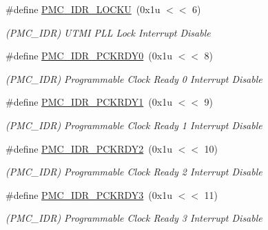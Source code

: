 \begin{DoxyCompactItemize}
\mbox{\label{group__SAME70__PMC_ga313fb194776f6a326f91150df714f990}} 
\#define \mbox{\hyperlink{group__SAME70__PMC_ga313fb194776f6a326f91150df714f990}{P\+M\+C\+\_\+\+I\+D\+R\+\_\+\+L\+O\+C\+KU}}~(0x1u $<$$<$ 6)
\begin{DoxyCompactList}\small\item\em (P\+M\+C\+\_\+\+I\+DR) U\+T\+MI P\+LL Lock Interrupt Disable \end{DoxyCompactList}\item 
\mbox{\label{group__SAME70__PMC_gac6c95ab23e8b9ad179d3db96fa6c5d7b}} 
\#define \mbox{\hyperlink{group__SAME70__PMC_gac6c95ab23e8b9ad179d3db96fa6c5d7b}{P\+M\+C\+\_\+\+I\+D\+R\+\_\+\+P\+C\+K\+R\+D\+Y0}}~(0x1u $<$$<$ 8)
\begin{DoxyCompactList}\small\item\em (P\+M\+C\+\_\+\+I\+DR) Programmable Clock Ready 0 Interrupt Disable \end{DoxyCompactList}\item 
\mbox{\label{group__SAME70__PMC_ga41d50baa84ca59665f79584f6c769f54}} 
\#define \mbox{\hyperlink{group__SAME70__PMC_ga41d50baa84ca59665f79584f6c769f54}{P\+M\+C\+\_\+\+I\+D\+R\+\_\+\+P\+C\+K\+R\+D\+Y1}}~(0x1u $<$$<$ 9)
\begin{DoxyCompactList}\small\item\em (P\+M\+C\+\_\+\+I\+DR) Programmable Clock Ready 1 Interrupt Disable \end{DoxyCompactList}\item 
\mbox{\label{group__SAME70__PMC_ga3b5f0b5c79321b5b99ab7f2fdeda0ed1}} 
\#define \mbox{\hyperlink{group__SAME70__PMC_ga3b5f0b5c79321b5b99ab7f2fdeda0ed1}{P\+M\+C\+\_\+\+I\+D\+R\+\_\+\+P\+C\+K\+R\+D\+Y2}}~(0x1u $<$$<$ 10)
\begin{DoxyCompactList}\small\item\em (P\+M\+C\+\_\+\+I\+DR) Programmable Clock Ready 2 Interrupt Disable \end{DoxyCompactList}\item 
\mbox{\label{group__SAME70__PMC_ga03a07ac60c6f4bcfa4b7d6aaafa462eb}} 
\#define \mbox{\hyperlink{group__SAME70__PMC_ga03a07ac60c6f4bcfa4b7d6aaafa462eb}{P\+M\+C\+\_\+\+I\+D\+R\+\_\+\+P\+C\+K\+R\+D\+Y3}}~(0x1u $<$$<$ 11)
\begin{DoxyCompactList}\small\item\em (P\+M\+C\+\_\+\+I\+DR) Programmable Clock Ready 3 Interrupt Disable \end{DoxyCompactList}\item 
$$
\end{DoxyCompactItemize}
